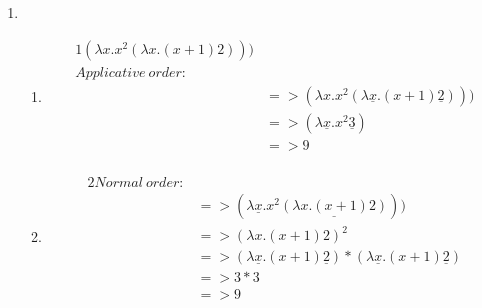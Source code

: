 \documentclass[11pt]{article}
\begin{document}
\begin{enumerate}
\begin{enumerate}
\begin{lstlisting}
int main()
{
    std::function<void(int,char,char,char)> hanoi;
    hanoi=[&hanoi](int a,char from,char aux,char to)  {
        if(a==1){
           cout<<"\t\tMove disc 1 from "<<from<<" to "<<to<<"\n";
           return;
        }
        else{
           hanoi(a-1,from,to,aux);
           cout<<"\t\tMove disc "<<a<<" from "<<from<<" to "<<to<<"\n";
           hanoi(a-1,aux,from,to);
        }
    };
    cout<<"hanoi(8): "<<endl;
     hanoi(8,'A','B','C');
}
     \end{lstlisting}
 \end{enumerate}
\item \begin{enumerate}
    \item 
    \begin{alignat*}{1}
    (\lambda x.x^2 (\lambda x.(x + 1) 2)))\\
Applicative\:order :\\
&=> (\lambda x.x^2 (\lambda  ​\underline{x} ​.(x + 1) ​\underline{2} ​)))\\
&=> (\lambda  ​\underline{x} ​.x^2 ​\underline{3} ​)\\
&=> 9\\
\end{alignat*}
\item 
\begin{alignat*}{2}
Normal\:order :\\
&=> (\lambda  ​\underline{x} ​.x^2 ​\underline{(\lambda x.(x + 1) 2)}) ​)\\
&=> (\lambda x.(x+1) 2)^2\\
&=> (\lambda  ​\underline{x} ​.(x+1) ​\underline{2} ​) * (\lambda ​\underline{x} ​.(x+1) ​\underline{2} ​)\\
&=> 3 * 3\\
&=> 9
\end{alignat*}
\end{enumerate}
\end{enumerate}
\end{document}
